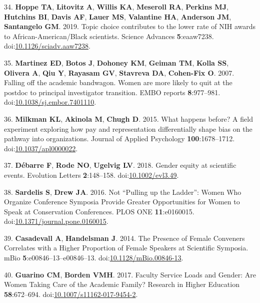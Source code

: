 \documentclass[11pt,]{article}
\begin{document}
\leavevmode\hypertarget{ref-Hoppe2019}{}%
34. \textbf{Hoppe TA}, \textbf{Litovitz A}, \textbf{Willis KA},
\textbf{Meseroll RA}, \textbf{Perkins MJ}, \textbf{Hutchins BI},
\textbf{Davis AF}, \textbf{Lauer MS}, \textbf{Valantine HA},
\textbf{Anderson JM}, \textbf{Santangelo GM}. 2019. Topic choice
contributes to the lower rate of NIH awards to African-American/Black
scientists. Science Advances \textbf{5}:eaaw7238.
doi:\href{https://doi.org/10.1126/sciadv.aaw7238}{10.1126/sciadv.aaw7238}.

\leavevmode\hypertarget{ref-Martinez2007}{}%
35. \textbf{Martinez ED}, \textbf{Botos J}, \textbf{Dohoney KM},
\textbf{Geiman TM}, \textbf{Kolla SS}, \textbf{Olivera A}, \textbf{Qiu
Y}, \textbf{Rayasam GV}, \textbf{Stavreva DA}, \textbf{Cohen-Fix O}.
2007. Falling off the academic bandwagon. Women are more likely to quit
at the postdoc to principal investigator transition. EMBO reports
\textbf{8}:977--981.
doi:\href{https://doi.org/10.1038/sj.embor.7401110}{10.1038/sj.embor.7401110}.

\leavevmode\hypertarget{ref-Milkman2015}{}%
36. \textbf{Milkman KL}, \textbf{Akinola M}, \textbf{Chugh D}. 2015.
What happens before? A field experiment exploring how pay and
representation differentially shape bias on the pathway into
organizations. Journal of Applied Psychology \textbf{100}:1678--1712.
doi:\href{https://doi.org/10.1037/apl0000022}{10.1037/apl0000022}.

\leavevmode\hypertarget{ref-debarre_gender_2018}{}%
37. \textbf{Débarre F}, \textbf{Rode NO}, \textbf{Ugelvig LV}. 2018.
Gender equity at scientific events. Evolution Letters
\textbf{2}:148--158.
doi:\href{https://doi.org/10.1002/evl3.49}{10.1002/evl3.49}.

\leavevmode\hypertarget{ref-sardelis_not_2016}{}%
38. \textbf{Sardelis S}, \textbf{Drew JA}. 2016. Not ``Pulling up the
Ladder'': Women Who Organize Conference Symposia Provide Greater
Opportunities for Women to Speak at Conservation Conferences. PLOS ONE
\textbf{11}:e0160015.
doi:\href{https://doi.org/10.1371/journal.pone.0160015}{10.1371/journal.pone.0160015}.

\leavevmode\hypertarget{ref-casadevall_presence_2014}{}%
39. \textbf{Casadevall A}, \textbf{Handelsman J}. 2014. The Presence of
Female Conveners Correlates with a Higher Proportion of Female Speakers
at Scientific Symposia. mBio \textbf{5}:e00846--13--e00846--13.
doi:\href{https://doi.org/10.1128/mBio.00846-13}{10.1128/mBio.00846-13}.

\leavevmode\hypertarget{ref-guarino_faculty_2017}{}%
40. \textbf{Guarino CM}, \textbf{Borden VMH}. 2017. Faculty Service
Loads and Gender: Are Women Taking Care of the Academic Family? Research
in Higher Education \textbf{58}:672--694.
doi:\href{https://doi.org/10.1007/s11162-017-9454-2}{10.1007/s11162-017-9454-2}.
\end{document}
